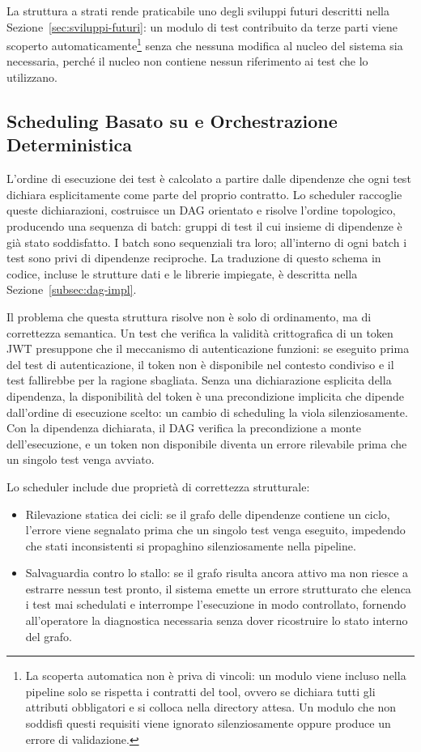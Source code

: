 La struttura a strati rende praticabile uno degli sviluppi futuri descritti nella Sezione~\ref{sec:sviluppi-futuri}: un modulo di test contribuito da terze parti viene scoperto automaticamente\footnote{La scoperta automatica non è priva di vincoli: un modulo viene incluso nella pipeline solo se rispetta i contratti del tool, ovvero se dichiara tutti gli attributi obbligatori e si colloca nella directory attesa. Un modulo che non soddisfi questi requisiti viene ignorato silenziosamente oppure produce un errore di validazione.} senza che nessuna modifica al nucleo del sistema sia necessaria, perché il nucleo non contiene nessun riferimento ai test che lo utilizzano.


\subsection{Scheduling Basato su  e Orchestrazione Deterministica}\label{subsec:dag}

L'ordine di esecuzione dei test è calcolato a partire dalle dipendenze che ogni test dichiara esplicitamente come parte del proprio contratto. Lo scheduler raccoglie queste dichiarazioni, costruisce un \gls{DAG} orientato e risolve l'ordine topologico, producendo una sequenza di batch: gruppi di test il cui insieme di dipendenze è già stato soddisfatto. I batch sono sequenziali tra loro; all'interno di ogni batch i test sono privi di dipendenze reciproche. La traduzione di questo schema in codice, incluse le strutture dati e le librerie impiegate, è descritta nella Sezione~\ref{subsec:dag-impl}.

Il problema che questa struttura risolve non è solo di ordinamento, ma di correttezza semantica. Un test che verifica la validità crittografica di un token \gls{JWT} presuppone che il meccanismo di autenticazione funzioni: se eseguito prima del test di autenticazione, il token non è disponibile nel contesto condiviso e il test fallirebbe per la ragione sbagliata. Senza una dichiarazione esplicita della dipendenza, la disponibilità del token è una precondizione implicita che dipende dall'ordine di esecuzione scelto: un cambio di scheduling la viola silenziosamente. Con la dipendenza dichiarata, il \gls{DAG} verifica la precondizione a monte dell'esecuzione, e un token non disponibile diventa un errore rilevabile prima che un singolo test venga avviato.

Lo scheduler include due proprietà di correttezza strutturale:

\begin{itemize}
      \item Rilevazione statica dei cicli: se il grafo delle dipendenze contiene un ciclo, l'errore viene segnalato prima che un singolo test venga eseguito, impedendo che stati inconsistenti si propaghino silenziosamente nella pipeline.
      \item Salvaguardia contro lo stallo: se il grafo risulta ancora attivo ma non riesce a estrarre nessun test pronto, il sistema emette un errore strutturato che elenca i test mai schedulati e interrompe l'esecuzione in modo controllato, fornendo all'operatore la diagnostica necessaria senza dover ricostruire lo stato interno del grafo.
\end{itemize}

